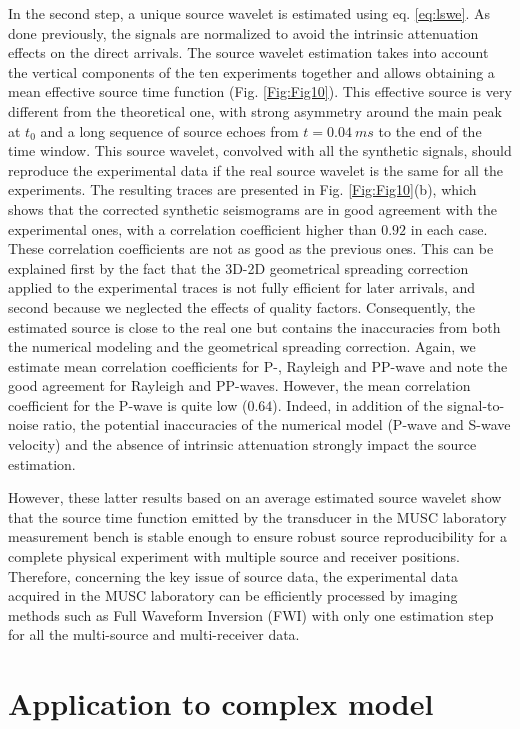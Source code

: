 \documentclass[extra,mreferee]{gji}
\begin{document}
In the second step, a unique source wavelet is estimated using eq. \ref{eq:lswe}. As done previously, the signals are normalized to avoid the intrinsic attenuation effects on the direct arrivals. The source wavelet estimation takes into account the vertical components of the ten experiments together and allows obtaining a mean effective source time function (Fig. \ref{Fig:Fig10}). This effective source is very different from the theoretical one, with strong asymmetry around the main peak at $t_{0}$ and a long sequence of source echoes from $t=0.04\ ms$ to the end of the time window. This source wavelet, convolved with all the synthetic signals, should reproduce the experimental data if the real source wavelet is the same for all the experiments. The resulting traces are presented in Fig. \ref{Fig:Fig10}(b), which shows that the corrected synthetic seismograms are in good agreement with the experimental ones, with a correlation coefficient higher than $0.92$ in each case. These correlation coefficients are not as good as the previous ones. This can be explained first by the fact that the 3D-2D geometrical spreading correction applied to the experimental traces is not fully efficient for later arrivals, and second because we neglected the effects of quality factors. Consequently, the estimated source is close to the real one but contains the inaccuracies from both the numerical modeling and the geometrical spreading correction. Again, we estimate mean correlation coefficients for P-, Rayleigh and PP-wave and note the good agreement for Rayleigh and PP-waves. However, the mean correlation coefficient for the P-wave is quite low ($0.64$). Indeed, in addition of the signal-to-noise ratio, the potential inaccuracies of the numerical model (P-wave and S-wave velocity) and the absence of intrinsic attenuation strongly impact the source estimation.

However, these latter results based on an average estimated source wavelet show that the source time function emitted by the transducer in the MUSC laboratory measurement bench is stable enough to ensure robust source reproducibility for a complete physical experiment with multiple source and receiver positions. Therefore, concerning the key issue of source data, the experimental data acquired in the MUSC laboratory can be efficiently processed by imaging methods such as Full Waveform Inversion (FWI) with only one estimation step for all the multi-source and multi-receiver data.

\section{Application to complex model}
\end{document}
